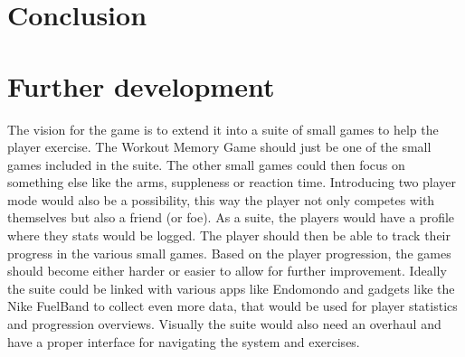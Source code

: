 \documentclass[11pt]{report}
\begin{document}
\section{Conclusion}


\section{Further development}
The vision for the game is to extend it into a suite of small games to help the player exercise. The Workout Memory Game should just be one of the small games included in the suite. The other small games could then focus on something else like the arms, suppleness or reaction time. Introducing two player mode would also be a possibility, this way the player not only competes with themselves but also a friend (or foe). As a suite, the players would have a profile where they stats would be logged. The player should then be able to track their progress in the various small games. Based on the player progression, the games should become either harder or easier to allow for further improvement. Ideally the suite could be linked with various apps like Endomondo and gadgets like the Nike FuelBand to collect even more data, that would be used for player statistics and progression overviews. Visually the suite would also need an overhaul and have a proper interface for navigating the system and exercises.
\end{document}
